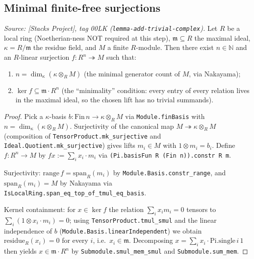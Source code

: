 \subsection{Minimal finite-free surjections}
\label{subsec:ab_gap1_first_step}
\begin{lemma}\leanok
  \label{lem:exists_minimalSurjection_finite_localRing}
  \textit{Source: [Stacks Project], tag 00LK
    (\texttt{lemma-add-trivial-complex}).}
  Let \(R\) be a local ring (Noetherian-ness NOT required at this
  step), \(\mathfrak m \subseteq R\) the maximal ideal,
  \(\kappa = R/\mathfrak m\) the residue field, and \(M\) a finite
  \(R\)-module. Then there exist \(n \in \mathbb N\) and an
  \(R\)-linear surjection \(f : R^n \twoheadrightarrow M\) such that:
  \begin{enumerate}
    \item \(n = \dim_\kappa(\kappa \otimes_R M)\) (the minimal
      generator count of \(M\), via Nakayama);
    \item \(\ker f \subseteq \mathfrak m \cdot R^n\) (the
      ``minimality'' condition: every entry of every relation lives
      in the maximal ideal, so the chosen lift has no trivial
      summands).
  \end{enumerate}
\end{lemma}
\begin{proof}

\leanok
  Pick a \(\kappa\)-basis
  \(b : \mathrm{Fin}\,n \to \kappa \otimes_R M\) via
  \texttt{Module.finBasis} with
  \(n = \dim_\kappa(\kappa \otimes_R M)\). Surjectivity of the
  canonical map \(M \twoheadrightarrow \kappa \otimes_R M\)
  (composition of \texttt{TensorProduct.mk\_surjective} and
  \texttt{Ideal.Quotient.mk\_surjective}) gives lifts
  \(m_i \in M\) with \(1 \otimes m_i = b_i\). Define
  \(f : R^n \to M\) by \(f x := \sum_i x_i \cdot m_i\) via
  \texttt{(Pi.basisFun R (Fin n)).constr R m}.

  Surjectivity: \(\mathrm{range}\, f = \mathrm{span}_R(m_i)\) by
  \texttt{Module.Basis.constr\_range}, and
  \(\mathrm{span}_R(m_i) = M\) by Nakayama via
  \texttt{IsLocalRing.span\_eq\_top\_of\_tmul\_eq\_basis}.

  Kernel containment: for \(x \in \ker f\) the relation
  \(\sum_i x_i m_i = 0\) tensors to
  \(\sum_i (1 \otimes x_i \cdot m_i) = 0\); using
  \texttt{TensorProduct.tmul\_smul} and the linear independence of
  \(b\) (\texttt{Module.Basis.linearIndependent}) we obtain
  \(\mathrm{residue}_R(x_i) = 0\) for every \(i\), i.e.\
  \(x_i \in \mathfrak m\). Decomposing
  \(x = \sum_i x_i \cdot \mathrm{Pi.single}\,i\,1\) then yields
  \(x \in \mathfrak m \cdot R^n\) by
  \texttt{Submodule.smul\_mem\_smul} and
  \texttt{Submodule.sum\_mem}.
\end{proof}

